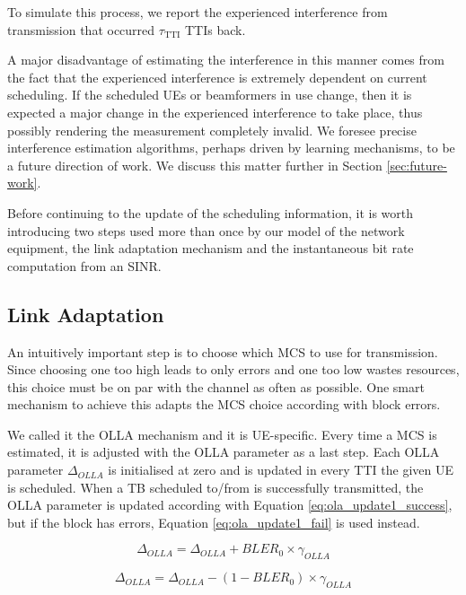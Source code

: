 To simulate this process, we report the experienced interference from transmission that occurred $\tau_\text{TTI}$ TTIs back. 

A major disadvantage of estimating the interference in this manner comes from the fact that the experienced interference is extremely dependent on current scheduling. If the scheduled UEs or beamformers in use change, then it is expected a major change in the experienced interference to take place, thus possibly rendering the measurement completely invalid. We foresee precise interference estimation algorithms, perhaps driven by learning mechanisms, to be a future direction of work. We discuss this matter further in Section \ref{sec:future-work}. 

Before continuing to the update of the scheduling information, it is worth introducing two steps used more than once by our model of the network equipment, the link adaptation mechanism and the instantaneous bit rate computation from an SINR. 

\subsection*{Link Adaptation}
\label{sec:olla}

An intuitively important step is to choose which MCS to use for transmission. Since choosing one too high leads to only errors and one too low wastes resources, this choice must be on par with the channel as often as possible. One smart mechanism to achieve this adapts the MCS choice according with block errors.

We called it the \ac{OLLA} mechanism and it is UE-specific. Every time a MCS is estimated, it is adjusted with the OLLA parameter as a last step. Each OLLA parameter $\Delta_{OLLA}$ is initialised at zero and is updated in every TTI the given UE is scheduled. When a \ac{TB} scheduled to/from is successfully transmitted, the OLLA parameter is updated according with Equation \eqref{eq:ola_update1_success}, but if the block has errors, Equation \eqref{eq:ola_update1_fail} is used instead.


\begin{equation} \label{eq:ola_update1_success}
    \Delta_{OLLA} = \Delta_{OLLA} + BLER_0 \times \gamma_{OLLA}
\end{equation}

\begin{equation} \label{eq:ola_update1_fail}
    \Delta_{OLLA} = \Delta_{OLLA} - (1 - BLER_0) \times \gamma_{OLLA}
\end{equation}


